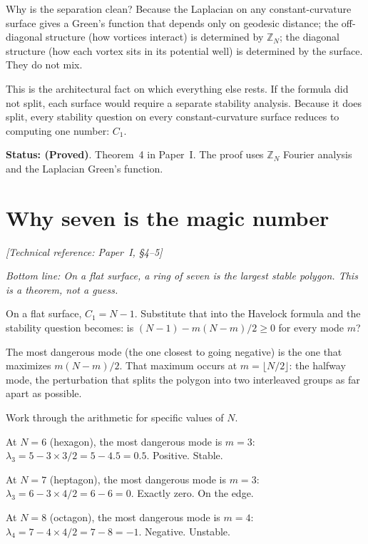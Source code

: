 Why is the separation clean? Because the Laplacian on any
constant-curvature surface gives a Green's function that depends only
on geodesic distance; the off-diagonal structure (how vortices
interact) is determined by $\mathbb{Z}_N$; the diagonal structure (how
each vortex sits in its potential well) is determined by the surface.
They do not mix.

This is the architectural fact on which everything else rests. If the
formula did not split, each surface would require a separate stability
analysis. Because it does split, every stability question on every
constant-curvature surface reduces to computing one number: $C_1$.

\textbf{Status: (Proved)}. Theorem~4 in Paper~I. The proof
uses $\mathbb{Z}_N$ Fourier analysis and the Laplacian Green's function.


\section{Why seven is the magic number}
\noindent\textit{[Technical reference: Paper~I, \S4--5]}

\medskip

\noindent\textit{Bottom line: On a flat surface, a ring of seven is
the largest stable polygon. This is a theorem, not a guess.}

\medskip

On a flat surface, $C_1 = N - 1$. Substitute that into the Havelock
formula and the stability question becomes: is
$(N - 1) - m(N - m)/2 \ge 0$ for every mode $m$?

The most dangerous mode (the one closest to going negative) is the
one that maximizes $m(N - m)/2$. That maximum occurs at
$m = \lfloor N/2 \rfloor$: the halfway mode, the perturbation that
splits the polygon into two interleaved groups as far apart as
possible.

Work through the arithmetic for specific values of $N$.

At $N = 6$ (hexagon), the most dangerous mode is $m = 3$:
$\lambda_3 = 5 - 3 \times 3/2 = 5 - 4.5 = 0.5$. Positive. Stable.

At $N = 7$ (heptagon), the most dangerous mode is $m = 3$:
$\lambda_3 = 6 - 3 \times 4/2 = 6 - 6 = 0$. Exactly zero. On the
edge.

At $N = 8$ (octagon), the most dangerous mode is $m = 4$:
$\lambda_4 = 7 - 4 \times 4/2 = 7 - 8 = -1$. Negative. Unstable.

